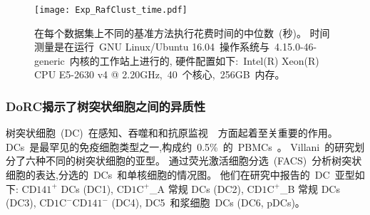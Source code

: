     \begin{figure}[!htbp]
        \centering
        \texttt{[image: Exp\_RafClust\_time.pdf]}
        \caption{
        在每个数据集上不同的基准方法执行花费时间的中位数~(秒)。
        时间测量是在运行~GNU Linux/Ubuntu 16.04~操作系统与~4.15.0-46-generic~内核的工作站上进行的,
        硬件配置如下:~Intel(R) Xeon(R) CPU E5-2630 v4 @ 2.20GHz,~40~个核心,~256GB~内存。
        }
        \label{supp-fig:clusteringtime}
    \end{figure}

\subsubsection{DoRC揭示了树突状细胞之间的异质性}
树突状细胞~(DC)~在感知、吞噬和和抗原监视~\cite{villani2017single}~方面起着至关重要的作用。
DCs~是最罕见的免疫细胞类型之一,构成约~0.5\%~的~PBMCs~\cite{zheng2017massively}。
Villani~\cite{villani2017single}的研究划分了六种不同的树突状细胞的亚型。
通过荧光激活细胞分选~(FACS)~分析树突状细胞的表达,分选的~DCs~和单核细胞的情况图。
他们在研究中报告的~DC~亚型如下:
$\text{CD141}^+$ DCs (DC1), 
$\text{CD1C}^+${\_}A 常规 DCs (DC2),
$\text{CD1C}^+${\_}B 常规 DCs (DC3),
$\text{CD1C}^-\text{CD141}^-$ (DC4), DC5~和浆细胞~DCs (DC6, pDCs)。

